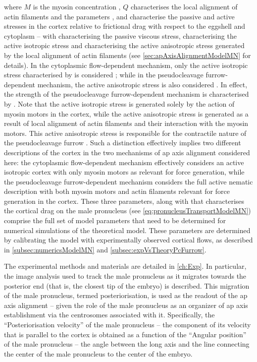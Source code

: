 where $M$ is the myosin concentration \citep{gross2019guiding}, $Q$ characterises the local alignment of actin filaments \citep{reymann2016cortical} and the parameters \hydrodynamicLength, \activeRelaxLength and \nematicLength characterise the passive and active stresses in the cortex relative to frictional drag with respect to the eggshell and cytoplasm -- with \hydrodynamicLength characterising the passive viscous stress, \activeRelaxLength characterising the active isotropic stress and \nematicLength characterising the active anisotropic stress generated by the local alignment of actin filaments (see \autoref{sec:apAxisAlignmentModelMN} for details). In the cytoplasmic flow-dependent mechanism, only the active isotropic stress characterised by \activeRelaxLength is considered \citep{gross2019guiding,mayer2010anisotropies}; while in the pseudocleavage furrow-dependent mechanism, the active anisotropic stress is also considered \citep{reymann2016cortical}. In effect, the strength of the pseudocleavage furrow-dependent mechanism is characterised by \nematicLength. Note that the active isotropic stress is generated solely by the action of myosin motors in the cortex, while the active anisotropic stress is generated as a result of local alignment of actin filaments and their interaction with the myosin motors. This active anisotropic stress is responsible for the contractile nature of the pseudocleavage furrow \citep{reymann2016cortical}. Such a distinction effectively implies two different descriptions of the cortex in the two mechanisms of \ac{ap} axis alignment considered here: the cytoplasmic flow-dependent mechanism effectively considers an active isotropic cortex with only myosin motors as relevant for force generation, while the pseudocleavage furrow-dependent mechanism considers the full active nematic description with both myosin motors and actin filaments relevant for force generation in the cortex. These three parameters, along with \dragCoefficient that characterises the cortical drag on the male pronucleus (see \autoref{eq:pronucleusTransportModelMN}) comprise the full set of model parameters that need to be determined for numerical simulations of the theoretical model. These parameters are determined by calibrating the model with experimentally observed cortical flows, as described in \autoref{subsec:numericsModelMN} and \autoref{subsec:expVsTheoryPcFurrow}.

The experimental methods and materials are detailed in \autoref{ch:Exp}. In particular, the image analysis used to track the male pronucleus as it migrates towards the posterior end (that is, the closest tip of the embryo) is described. This migration of the male pronucleus, termed posteriorisation, is used as the readout of the \ac{ap} axis alignment -- given the role of the male pronucleus as an organizer of \ac{ap} axis establishment via the centrosomes associated with it. Specifically, the \enquote{Posteriorisation velocity} of the male pronucleus -- the component of its velocity that is parallel to the cortex is obtained as a function of the \enquote{Angular position} of the male pronucleus -- the angle between the long axis and the line connecting the center of the male pronucleus to the center of the embryo.  

